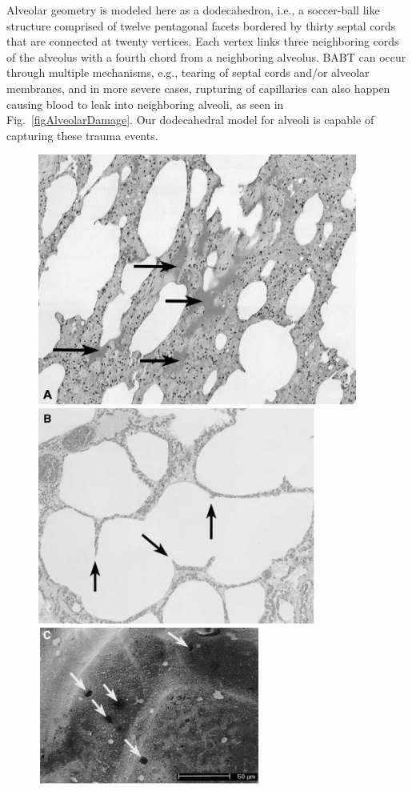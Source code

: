 Alveolar geometry is modeled here as a dodecahedron, i.e., a soccer-ball like structure comprised of twelve pentagonal facets bordered by thirty septal cords that are connected at twenty vertices.  Each vertex links three neighboring cords of the alveolus with a fourth chord from a neighboring alveolus.  BABT can occur through multiple mechanisms, e.g., tearing of septal cords and\slash or alveolar membranes, and in more severe cases, rupturing of capillaries can also happen causing blood to leak into neighboring alveoli, as seen in Fig.~\ref{figAlveolarDamage}.  Our dodecahedral model for alveoli is capable of capturing these trauma events.

\begin{figure}
    {\par\centering
        \resizebox*{0.3\textwidth}{0.2\textheight}
        {\includegraphics{figures/edemaDamage.png}} 
        \resizebox*{0.3\textwidth}{0.2\textheight}
        {\includegraphics{figures/septalDamage.png}}
        \resizebox*{0.3\textwidth}{0.2\textheight}
        {\includegraphics{figures/alveolarDamage.png}}
}
\end{figure}

